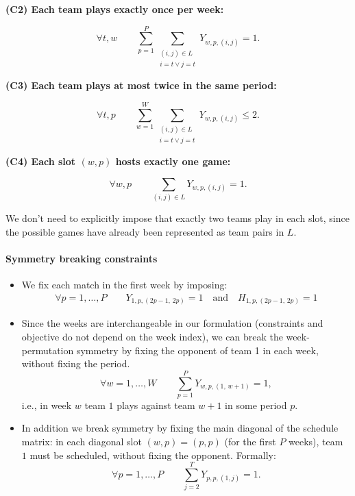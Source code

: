 \textbf{(C2) Each team plays exactly once per week:}

\[
\forall t,w \qquad
\sum_{p=1}^{P}
\sum_{\substack{(i,j)\in L \\ i=t \vee j=t}}
Y_{w,p,(i,j)} = 1.
\]

\textbf{(C3) Each team plays at most twice in the same period:}

\[
\forall t,p \qquad
\sum_{w=1}^{W}
\sum_{\substack{(i,j)\in L \\ i=t \vee j=t}}
Y_{w,p,(i,j)} \leq 2.
\]

\textbf{(C4) Each slot $(w,p)$ hosts exactly one game:}

\[
\forall w,p \qquad
\sum_{(i,j)\in L} Y_{w,p,(i,j)} = 1.
\]

We don't need to explicitly impose that exactly two teams
play in each slot, since the possible games have already been represented as
team pairs in $L$.

\paragraph{Symmetry breaking constraints}
\begin{itemize}
    
    \item[(C5)] We fix each match in the first week by imposing:
    \begin{align*}
        \forall p =1,\dots,P\qquad   Y_{1,p,(2p-1,\,2p)}=1\quad \text{and} \quad
        H_{1,p,(2p-1,\,2p)}=1
    \end{align*}
    
    \item[(C6)] Since the weeks are interchangeable in our formulation (constraints and objective do not depend on the week index), we can break the week-permutation symmetry by fixing the opponent of team 1 in each week, without fixing the period.
    \[
    \forall w = 1,\dots,W \qquad \sum_{p = 1}^P Y_{w,p,(1,\,w+1)} = 1,
    \]
    i.e., in week \(w\) team \(1\) plays against team \(w+1\) in some period \(p\).

    \item[(C7)] In addition we break symmetry by fixing the main diagonal of the schedule matrix: in each diagonal slot \((w,p)=(p,p)\) (for the first \(P\) weeks), team \(1\) must be scheduled, without fixing the opponent. Formally:
    \[
    \forall p = 1,\dots,P \qquad
    \sum_{j=2}^{T} Y_{p,p,(1,j)} = 1.
    \]
    
\end{itemize}


